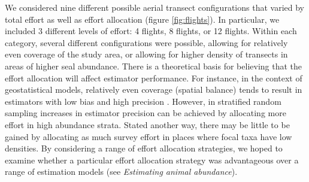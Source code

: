 \documentclass[]{rsos}%
\begin{document}
We considered nine different possible aerial transect configurations that varied by total effort as well as effort allocation (figure \ref{fig:flights}). In particular, we included 3 different levels of effort: 4 flights, 8 flights, or 12 flights.  Within each category, several different configurations were possible, allowing for relatively even coverage of the study area, or allowing for higher density of transects in areas of higher seal abundance.  There is a theoretical basis for believing that the effort allocation will affect estimator performance.  For instance, in the context of geostatistical models, relatively even coverage (spatial balance) tends to result in estimators with low bias and high precision \cite{RoyleNychka1998,StevensOlsen2004}.  However, in stratified random sampling \cite{Cochran1977} increases in estimator precision can be achieved by allocating more effort in high abundance strata.  Stated another way, there may be little to be gained by allocating as much survey effort in places where focal taxa have low densities.  By considering a range of effort allocation strategies, we hoped to examine whether a particular effort allocation strategy was advantageous over a range of estimation models (see \textit{Estimating animal abundance}).
\end{document}
